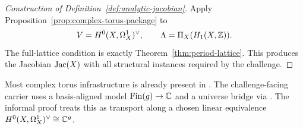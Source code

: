 \begin{proof}[Construction of Definition~\ref{def:analytic-jacobian}]\leanok
Apply Proposition~\ref{prop:complex-torus-package} to
\[
  V=H^{0}(X,\Omega^{1}_{X})^{\vee},\qquad \Lambda=\Pi_X(H_1(X,\mathbb{Z})).
\]
The full-lattice condition is exactly Theorem~\ref{thm:period-lattice}. This
produces the Jacobian \(\operatorname{Jac}(X)\) with all structural instances required by
the challenge.
\end{proof}

\begin{formalizationnote}
Most complex torus infrastructure is already present in
. The challenge-facing carrier uses a
basis-aligned model \(\operatorname{Fin}(g)\to\mathbb{C}\) and a universe bridge via
. The informal proof treats this as transport along a chosen
linear equivalence \(H^{0}(X,\Omega^{1}_{X})^{\vee}\cong\mathbb{C}^g\).
\end{formalizationnote}
